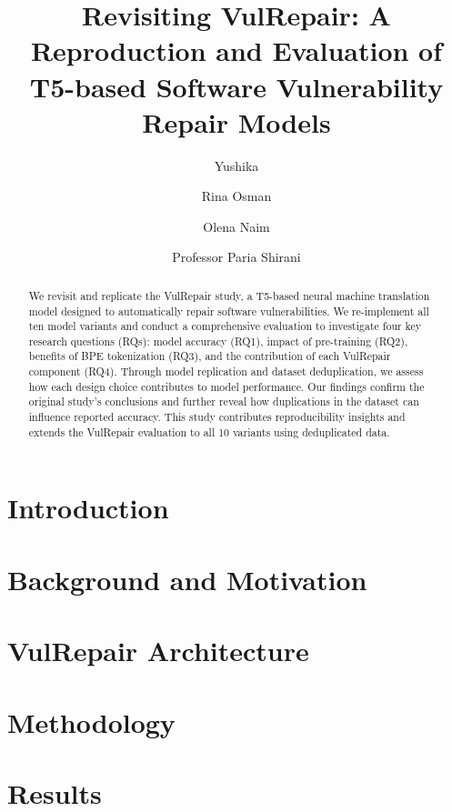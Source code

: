 \documentclass[sigconf,nonacm]{acmart}
\title{Revisiting VulRepair: A Reproduction and Evaluation of T5-based Software Vulnerability Repair Models}
\author{Yushika}
\affiliation{%
  \institution{University of Ottawa}
  \city{Ottawa}
  \country{Canada}
}
\author{Rina Osman}
\affiliation{%
  \institution{University of Ottawa}
  \city{Ottawa}
  \country{Canada}
}
\author{Olena Naim}
\affiliation{%
  \institution{University of Ottawa}
  \city{Ottawa}
  \country{Canada}
}
\author{Professor Paria Shirani}
\affiliation{%
  \institution{University of Ottawa}
  \city{Ottawa}
  \country{Canada}
}
\begin{document}
\begin{abstract}
We revisit and replicate the VulRepair study, a T5-based neural machine translation model designed to automatically repair software vulnerabilities. We re-implement all ten model variants and conduct a comprehensive evaluation to investigate four key research questions (RQs): model accuracy (RQ1), impact of pre-training (RQ2), benefits of BPE tokenization (RQ3), and the contribution of each VulRepair component (RQ4). Through model replication and dataset deduplication, we assess how each design choice contributes to model performance. Our findings confirm the original study's conclusions and further reveal how duplications in the dataset can influence reported accuracy. This study contributes reproducibility insights and extends the VulRepair evaluation to all 10 variants using deduplicated data.
\end{abstract}


\maketitle

\section{Introduction}


\section{Background and Motivation}


\section{VulRepair Architecture}


\section{Methodology}


\section{Results}

\end{document}
